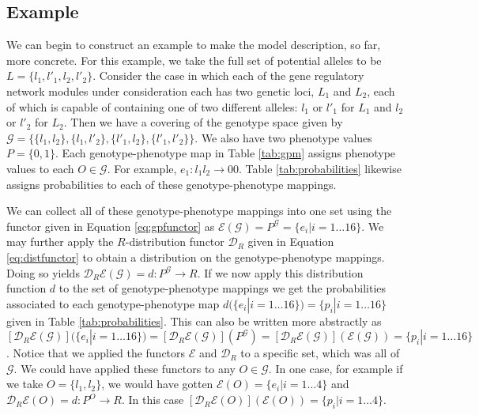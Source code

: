 \documentclass[10pt]{article}
\begin{document}
\subsection*{Example}
We can begin to construct an example to make the model description, so far, more concrete. For this example, we take the full set of potential alleles to be $L = \{ l_1,l'_1,l_2,l'_2 \}$. Consider the case in which each of the gene regulatory network modules under consideration each has two genetic loci, $L_1$ and $L_2$, each of which is capable of containing one of two different alleles: $l_1$ or $l'_1$ for $L_1$ and $l_2$ or $l'_2$ for $L_2$. Then we have a covering of the genotype space given by $\mathcal{G} = \{\{l_1,l_2 \},\{l_1,l'_2 \},\{l'_1,l_2\},\{l'_1,l'_2\} \}$. We also have two phenotype values $P = \{0, 1\}$. Each genotype-phenotype map in Table \ref{tab:gpm} assigns phenotype values to each $O \in \mathcal{G}$. For example, $e_1 \colon	l_1 l_2 \rightarrow 00$. Table \ref{tab:probabilities} likewise assigns probabilities to each of these genotype-phenotype mappings.

We can collect all of these genotype-phenotype mappings into one set using the functor given in Equation \ref{eq:gpfunctor} as $\mathcal{E}(\mathcal{G}) = P^{\mathcal{G}} = \{e_i | i=1 \ldots 16 \}$. We may further apply the $R$-distribution functor $\mathcal{D}_R$ given in Equation \ref{eq:distfunctor} to obtain a distribution on the genotype-phenotype mappings. Doing so yields  $\mathcal{D}_R\mathcal{E}(\mathcal{G})=d \colon P^\mathcal{G} \rightarrow R$. If we now apply this distribution function $d$ to the set of genotype-phenotype mappings we get the probabilities associated to each genotype-phenotype map $d(\{e_i | i=1 \ldots 16 \}) = \{p_i|i=1 \ldots 16\}$ given in Table \ref{tab:probabilities}. This can also be written more abstractly as $\left[\mathcal{D}_R\mathcal{E}(\mathcal{G})\right](\{e_i | i=1 \ldots 16 \}) = \left[\mathcal{D}_R\mathcal{E}(\mathcal{G})\right](P^\mathcal{G}) = \left[\mathcal{D}_R\mathcal{E}(\mathcal{G})\right](\mathcal{E}(\mathcal{G})) = \{p_i|i=1 \ldots 16\}$. Notice that we applied the functors $\mathcal{E}$ and $\mathcal{D}_R$ to a specific set, which was all of $\mathcal{G}$. We could have applied these functors to any $O \in \mathcal{G}$. In one case, for example if we take $O = \{l_1, l_2\}$, we would have gotten $\mathcal{E}(O) = \{e_i|i=1 \ldots 4\}$ and $\mathcal{D}_R\mathcal{E}(O) = d \colon P^O \rightarrow R$. In this case $\left[\mathcal{D}_R\mathcal{E}(O)\right](\mathcal{E}(O)) = \{p_i|i=1 \ldots 4\}$.
\end{document}
